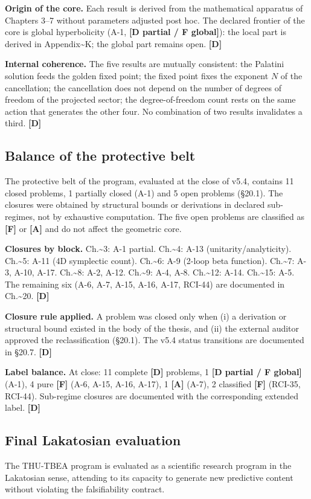 ﻿\documentclass[11pt,letterpaper]{article}
\begin{document}
\textbf{Origin of the core.} Each result is derived from the mathematical apparatus of Chapters 3--7 without parameters adjusted post hoc. The declared frontier of the core is global hyperbolicity (A-1, \textbf{[D partial / F global]}): the local part is derived in Appendix\textasciitilde{}K; the global part remains open. \textbf{[D]}

\textbf{Internal coherence.} The five results are mutually consistent: the Palatini solution feeds the golden fixed point; the fixed point fixes the exponent $N$ of the cancellation; the cancellation does not depend on the number of degrees of freedom of the projected sector; the degree-of-freedom count rests on the same action that generates the other four. No combination of two results invalidates a third. \textbf{[D]}
\subsection{Balance of the protective belt}
The protective belt of the program, evaluated at the close of v5.4, contains 11 closed problems, 1 partially closed (A-1) and 5 open problems (§20.1). The closures were obtained by structural bounds or derivations in declared sub-regimes, not by exhaustive computation. The five open problems are classified as \textbf{[F]} or \textbf{[A]} and do not affect the geometric core.

\textbf{Closures by block.} Ch.\textasciitilde{}3: A-1 partial. Ch.\textasciitilde{}4: A-13 (unitarity/analyticity). Ch.\textasciitilde{}5: A-11 (4D symplectic count). Ch.\textasciitilde{}6: A-9 (2-loop beta function). Ch.\textasciitilde{}7: A-3, A-10, A-17. Ch.\textasciitilde{}8: A-2, A-12. Ch.\textasciitilde{}9: A-4, A-8. Ch.\textasciitilde{}12: A-14. Ch.\textasciitilde{}15: A-5. The remaining six (A-6, A-7, A-15, A-16, A-17, RCI-44) are documented in Ch.\textasciitilde{}20. \textbf{[D]}

\textbf{Closure rule applied.} A problem was closed only when (i) a derivation or structural bound existed in the body of the thesis, and (ii) the external auditor approved the reclassification (§20.1). The v5.4 status transitions are documented in §20.7. \textbf{[D]}

\textbf{Label balance.} At close: 11 complete \textbf{[D]} problems, 1 \textbf{[D partial / F global]} (A-1), 4 pure \textbf{[F]} (A-6, A-15, A-16, A-17), 1 \textbf{[A]} (A-7), 2 classified \textbf{[F]} (RCI-35, RCI-44). Sub-regime closures are documented with the corresponding extended label. \textbf{[D]}
\subsection{Final Lakatosian evaluation}
The THU-TBEA program is evaluated as a scientific research program in the Lakatosian sense, attending to its capacity to generate new predictive content without violating the falsifiability contract.
\end{document}
